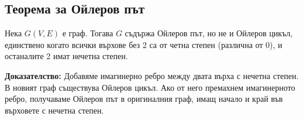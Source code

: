 \documentclass[fleqn,12pt]{article}
\begin{document}
\subsection{Теорема за Ойлеров път} 
Нека $G(V,E)$ е граф. Тогава $G$ съдържа Ойлеров път, но не и Ойлеров цикъл, единствено когато
всички върхове без 2 са от четна степен (различна от 0), и останалите 2 имат нечетна степен.

\textbf{Доказателство: } Добавяме имагинерно ребро между двата върха с нечетна степен. В новият граф съществува Ойлеров цикъл.
Ако от него премахнем имагинерното ребро, получаваме Ойлеров път в оригиналния граф, имащ начало и край във върховете с нечетна степен.
\end{document}
